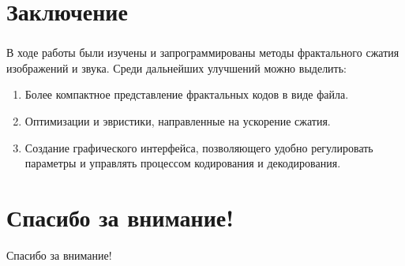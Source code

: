 \documentclass[t aspectratio=169]{beamer}
\begin{document}
  \section{Заключение}
  \begin{frame}\frametitle{\insertsection}
    \large
    В ходе работы были изучены и запрограммированы методы фрактального сжатия изображений и звука. Среди дальнейших улучшений можно выделить:
    \begin{enumerate}
      \item Более компактное представление фрактальных кодов в виде файла.
      \item Оптимизации и эвристики, направленные на ускорение сжатия.
      \item Создание графического интерфейса, позволяющего удобно регулировать параметры и управлять процессом кодирования и декодирования.
    \end{enumerate}
    \normalfont
  \end{frame}

  \section*{Спасибо за внимание!}
  \begin{frame}
    \begin{center}
      \huge Спасибо за внимание!\normalfont
    \end{center}
  \end{frame}
\end{document}
